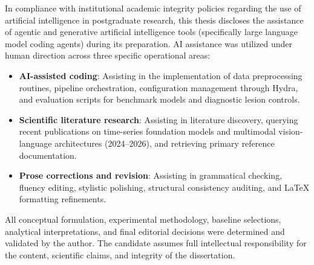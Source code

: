 In compliance with institutional academic integrity policies regarding the use of artificial intelligence in postgraduate research, this thesis discloses the assistance of agentic and generative artificial intelligence tools (specifically large language model coding agents) during its preparation. AI assistance was utilized under human direction across three specific operational areas:

\begin{itemize}
    \item \textbf{AI-assisted coding}: Assisting in the implementation of data preprocessing routines, pipeline orchestration, configuration management through Hydra, and evaluation scripts for benchmark models and diagnostic lesion controls.
    \item \textbf{Scientific literature research}: Assisting in literature discovery, querying recent publications on time-series foundation models and multimodal vision-language architectures (2024--2026), and retrieving primary reference documentation.
    \item \textbf{Prose corrections and revision}: Assisting in grammatical checking, fluency editing, stylistic polishing, structural consistency auditing, and \LaTeX{} formatting refinements.
\end{itemize}

All conceptual formulation, experimental methodology, baseline selections, analytical interpretations, and final editorial decisions were determined and validated by the author. The candidate assumes full intellectual responsibility for the content, scientific claims, and integrity of the dissertation.
